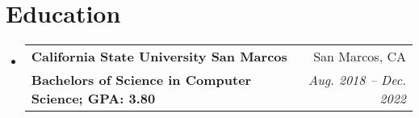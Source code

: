 \documentclass[letterpaper,11pt]{article}
\makeatletter
\newcommand{\resumeSubheading}[4]{
  \vspace{-1pt}\item
    \begin{tabular*}{0.97\textwidth}{l@{\extracolsep{\fill}}r}
      \textbf{#1} & #2 \\
      \textbf{\small#3} & \textit{\small #4} \\
    \end{tabular*}\vspace{-5pt}
}
\newcommand{\resumeSubHeadingListStart}{\begin{itemize}[leftmargin=*]}
\newcommand{\resumeSubHeadingListEnd}{\end{itemize}}
\makeatother
\begin{document}
\section{Education}
  \resumeSubHeadingListStart
    \resumeSubheading
      {California State University San Marcos}{San Marcos, CA}
      {Bachelors of Science in Computer Science;  GPA: 3.80}{Aug. 2018 -- Dec. 2022}
  \resumeSubHeadingListEnd

  \begin{comment}
  \section{Coursework}
  \resumeSubHeadingListStart
    \item{
      \textbf{Courses}{: Cloud Computing, Embedded Systems, Web Development, Operating Systems \& Architecture, Database Systems, Software Engineering, Data Structures \& Algorithms}
      \hfill
    }
  \resumeSubHeadingListEnd
  \end{comment}



\end{document}
